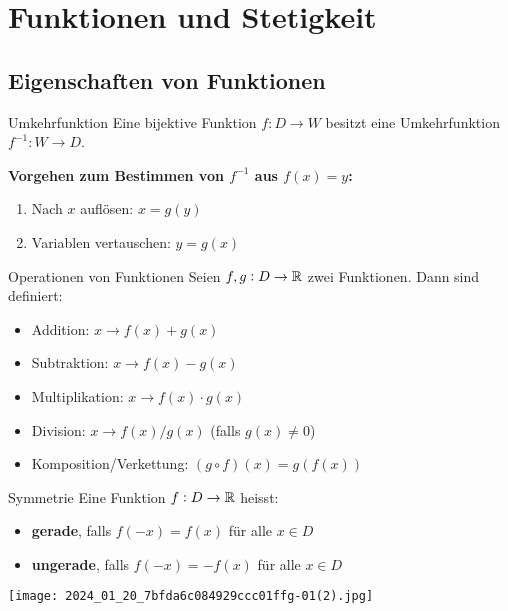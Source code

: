 \section{Funktionen und Stetigkeit}

\subsection{Eigenschaften von Funktionen}

\begin{definition}{Umkehrfunktion}
    Eine bijektive Funktion $f: D \rightarrow W$ besitzt eine Umkehrfunktion $f^{-1}: W \rightarrow D$.

    \textbf{Vorgehen zum Bestimmen von $f^{-1}$ aus $f(x)=y$:}
    \begin{enumerate}
        \item Nach $x$ auflösen: $x=g(y)$
        \item Variablen vertauschen: $y=g(x)$
    \end{enumerate}
\end{definition}

\begin{theorem}{Operationen von Funktionen}
    Seien $f, g: D \to \mathbb{R}$ zwei Funktionen. Dann sind definiert:
    \begin{itemize}
        \item Addition: $x \rightarrow f(x)+g(x)$
        \item Subtraktion: $x \rightarrow f(x)-g(x)$
        \item Multiplikation: $x \rightarrow f(x) \cdot g(x)$
        \item Division: $x \rightarrow f(x) / g(x)$ (falls $g(x) \neq 0$)
        \item Komposition/Verkettung: $(g \circ f)(x)=g(f(x))$
    \end{itemize}
\end{theorem}

\begin{definition}{Symmetrie}
    Eine Funktion $f: D \to \mathbb{R}$ heisst:
    \begin{itemize}
        \item \textbf{gerade}, falls $f(-x)=f(x)$ für alle $x \in D$
        \item \textbf{ungerade}, falls $f(-x)=-f(x)$ für alle $x \in D$
    \end{itemize}
\end{definition}

\begin{center}
    \texttt{[image: 2024\_01\_20\_7bfda6c084929ccc01ffg-01(2).jpg]}
\end{center}

